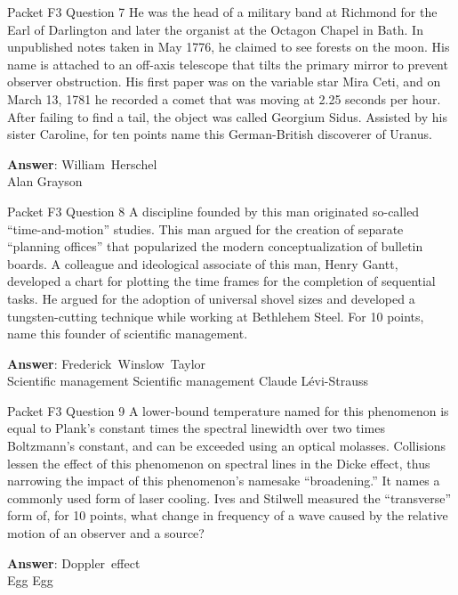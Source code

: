 \begin{frame}{Packet F3 Question 7}
He was the head of a military band at Richmond   for the Earl of Darlington and later the organist at the Octagon Chapel in Bath. In unpublished notes taken in May 1776, he claimed to see forests on the moon. His name is attached to an off-axis telescope that tilts   the primary mirror to prevent observer obstruction. His first paper was on the variable star Mira Ceti, and on March 13, 1781 he recorded   a comet that was moving at 2.25 seconds per hour. After failing to find a tail,   the object was called Georgium Sidus. Assisted by his sister Caroline, for ten points   name this German-British discoverer of Uranus.

\textbf{Answer}: William\ Herschel\\
 Alan Grayson
\end{frame}

\begin{frame}{Packet F3 Question 8}
A discipline founded by this man originated so-called “time-and-motion” studies. This man argued for the creation of separate “planning offices” that popularized the modern conceptualization of bulletin boards. A colleague and ideological associate of this man, Henry Gantt, developed a chart for plotting   the time frames for the completion of sequential tasks. He argued for the adoption of universal shovel sizes and developed a tungsten-cutting technique while working at Bethlehem Steel. For 10 points,     name this founder of scientific management.      

\textbf{Answer}: Frederick\ Winslow\ Taylor\\
 Scientific management
 Scientific management
 Claude Lévi-Strauss
\end{frame}

\begin{frame}{Packet F3 Question 9}
A lower-bound temperature     named for this phenomenon is equal to Plank’s constant times the spectral linewidth   over two times Boltzmann’s constant, and can be exceeded using an optical molasses. Collisions lessen the effect of this phenomenon on spectral lines in the Dicke effect, thus narrowing the impact of this phenomenon’s namesake “broadening.” It names a commonly used form of laser cooling. Ives and Stilwell measured   the “transverse”   form of, for 10 points, what change in frequency of a wave   caused by the relative motion of an observer and a source?

\textbf{Answer}: Doppler\ effect\\
 Egg
 Egg
\end{frame}

